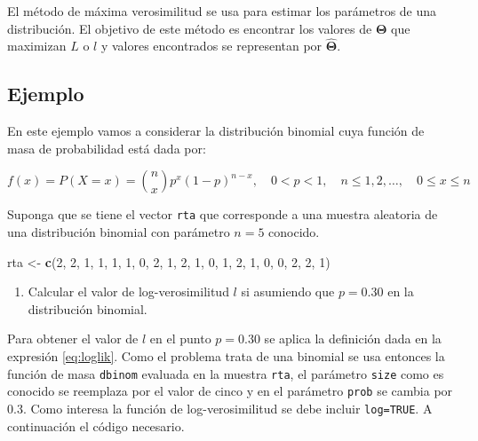 \documentclass[10pt,]{krantz}
\makeatletter
\newenvironment{Shaded}{\begin{snugshade}}{\end{snugshade}}
\newcommand{\KeywordTok}[1]{\textcolor[rgb]{0.13,0.29,0.53}{\textbf{#1}}}
\newcommand{\DecValTok}[1]{\textcolor[rgb]{0.00,0.00,0.81}{#1}}
\newcommand{\StringTok}[1]{\textcolor[rgb]{0.31,0.60,0.02}{#1}}
\newcommand{\NormalTok}[1]{#1}
\providecommand{\tightlist}{%
  \setlength{\itemsep}{0pt}\setlength{\parskip}{0pt}}
\newenvironment{kframe}{%
\medskip{}
\setlength{\fboxsep}{.8em}
 \def\at@end@of@kframe{}%
 \ifinner\ifhmode%
  \def\at@end@of@kframe{\end{minipage}}%
  \begin{minipage}{\columnwidth}%
 \fi\fi%
 \def\FrameCommand##1{\hskip\@totalleftmargin \hskip-\fboxsep
 \colorbox{shadecolor}{##1}\hskip-\fboxsep
     \hskip-\linewidth \hskip-\@totalleftmargin \hskip\columnwidth}%
 \MakeFramed {\advance\hsize-\width
   \@totalleftmargin\z@ \linewidth\hsize
   \@setminipage}}%
 {\par\unskip\endMakeFramed%
 \at@end@of@kframe}
\renewenvironment{Shaded}{\begin{kframe}}{\end{kframe}}
\makeatother
\begin{document}
El método de máxima verosimilitud se usa para estimar los parámetros de
una distribución. El objetivo de este método es encontrar los valores de
\(\boldsymbol{\Theta}\) que maximizan \(L\) o \(l\) y valores
encontrados se representan por \(\hat{\boldsymbol{\Theta}}\).

\subsection*{Ejemplo}\label{ejemplo-49}


En este ejemplo vamos a considerar la distribución binomial cuya función
de masa de probabilidad está dada por:

\[f(x)=P(X=x)=\binom{n}{x} p^x (1-p)^{n-x}, \quad 0<p<1, \quad n \leq 1, 2, \ldots, \quad 0 \leq x \leq n\]

Suponga que se tiene el vector \texttt{rta} que corresponde a una
muestra aleatoria de una distribución binomial con parámetro \(n=5\)
conocido.

\begin{Shaded}
\begin{Highlighting}[]
\NormalTok{rta <-}\StringTok{ }\KeywordTok{c}\NormalTok{(}\DecValTok{2}\NormalTok{, }\DecValTok{2}\NormalTok{, }\DecValTok{1}\NormalTok{, }\DecValTok{1}\NormalTok{, }\DecValTok{1}\NormalTok{, }\DecValTok{1}\NormalTok{, }\DecValTok{0}\NormalTok{, }\DecValTok{2}\NormalTok{, }\DecValTok{1}\NormalTok{, }\DecValTok{2}\NormalTok{,}
         \DecValTok{1}\NormalTok{, }\DecValTok{0}\NormalTok{, }\DecValTok{1}\NormalTok{, }\DecValTok{2}\NormalTok{, }\DecValTok{1}\NormalTok{, }\DecValTok{0}\NormalTok{, }\DecValTok{0}\NormalTok{, }\DecValTok{2}\NormalTok{, }\DecValTok{2}\NormalTok{, }\DecValTok{1}\NormalTok{)}
\end{Highlighting}
\end{Shaded}

\begin{enumerate}
\def\labelenumi{\arabic{enumi})}
\tightlist
\item
  Calcular el valor de log-verosimilitud \(l\) si asumiendo que
  \(p=0.30\) en la distribución binomial.
\end{enumerate}

Para obtener el valor de \(l\) en el punto \(p=0.30\) se aplica la
definición dada en la expresión \eqref{eq:loglik}. Como el problema trata
de una binomial se usa entonces la función de masa \texttt{dbinom}
evaluada en la muestra \texttt{rta}, el parámetro \texttt{size} como es
conocido se reemplaza por el valor de cinco y en el parámetro
\texttt{prob} se cambia por 0.3. Como interesa la función de
log-verosimilitud se debe incluir \texttt{log=TRUE}. A continuación el
código necesario.
\end{document}
